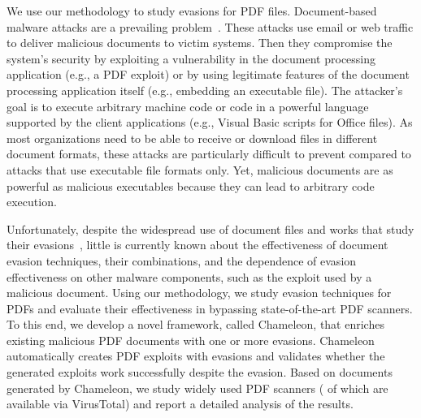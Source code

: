 We use our methodology to study evasions for PDF files.
Document-based malware attacks are a prevailing problem~\cite{pdf_cve_statistics, officeonrise, exploit_CVE_2018_4990}. These attacks use email or web traffic to deliver malicious documents to victim systems. Then they compromise the system's security by exploiting a vulnerability in the document processing application (e.g., a PDF exploit) or by using legitimate features of the document processing application itself (e.g., embedding an executable file). The attacker's goal is to execute arbitrary machine code or code in a powerful language supported by the client applications (e.g., Visual Basic scripts for Office files). As most organizations need to be able to receive or download files in different document formats, these attacks are particularly difficult to prevent compared to attacks that use executable file formats only. Yet, malicious documents are as powerful as malicious executables because they can lead to arbitrary code execution.

Unfortunately, despite the widespread use of document files and works that study their evasions~\cite{carmony2016extract, Maiorca2013, xu2016automatically, Dang2017, zhang2016adversarial, biggio2013evasion, laskov2014practical},
little is currently known about the effectiveness of document evasion techniques, their combinations, and the dependence of evasion effectiveness on other malware components, such as the exploit used by a malicious document.
Using our methodology, we study evasion techniques for PDFs 
and evaluate their effectiveness in bypassing state-of-the-art PDF scanners.
To this end, we develop a novel framework, called Chameleon, that enriches existing malicious 
PDF documents with one or more evasions.
Chameleon automatically creates PDF exploits with evasions and validates whether the generated exploits work successfully despite the evasion.
Based on \nbSamplesSize{} documents generated by Chameleon, we study 
\nbAnalyzers{} widely used PDF scanners (\nbVirusTotalEngines{} of which are available via VirusTotal) and report a detailed analysis of the results.

